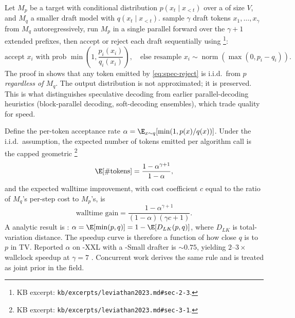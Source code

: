 Let $M_p$ be a target  with conditional distribution $p(x_t \mid
x_{<t})$ over a  of size $V$, and $M_q$ a smaller draft
model with $q(x_t \mid x_{<t})$. \citet{leviathan2023} sample $\gamma$
draft tokens $x_1, \ldots, x_\gamma$ from $M_q$ autoregressively, run
$M_p$ in a single parallel forward over the $\gamma + 1$ extended
prefixes, then accept or reject each draft sequentially using
\citep[\S 2.3]{leviathan2023}\footnote{KB excerpt:
\nolinkurl{kb/excerpts/leviathan2023.md#sec-2-3}.}:
\begin{equation}
\text{accept } x_i \text{ with prob } \min\!\left(1, \frac{p_i(x_i)}{q_i(x_i)}\right),
\quad \text{else resample } x_i \sim \operatorname{norm}(\max(0, p_i - q_i)).
\label{eq:spec-reject}
\end{equation}
The proof in \citet[App.~A.1]{leviathan2023} shows that any token
emitted by \cref{eq:spec-reject} is i.i.d.\ from $p$ \emph{regardless
of $M_q$}. The output distribution is not approximated; it is
preserved. This is what distinguishes speculative decoding from earlier
parallel-decoding heuristics (block-parallel decoding, soft-decoding
ensembles), which trade quality for speed.

Define the per-token acceptance rate
$\alpha = \E_{x \sim q}[\min(1, p(x)/q(x))]$. Under the i.i.d.\
assumption, the expected number of tokens emitted per algorithm call
is the capped geometric \citep[\S 3.1, Eq.~1]{leviathan2023}\footnote{KB
excerpt: \nolinkurl{kb/excerpts/leviathan2023.md#sec-3-1}.}
\begin{equation}
\E[\#\text{tokens}] = \frac{1 - \alpha^{\gamma+1}}{1 - \alpha},
\label{eq:spec-tokens}
\end{equation}
and the expected walltime improvement, with cost coefficient $c$ equal
to the ratio of $M_q$'s per-step cost to $M_p$'s, is
\citep[\S 3.3, Thm.~3.8]{leviathan2023}
\begin{equation}
\text{walltime gain} = \frac{1 - \alpha^{\gamma+1}}{(1-\alpha)(\gamma c + 1)}.
\label{eq:spec-walltime}
\end{equation}
A  analytic result is \citet[Thm.~3.5, Cor.~3.6]{leviathan2023}:
$\alpha = \E[\min(p, q)] = 1 - \E[D_{LK}(p, q)]$, where $D_{LK}$ is
total-variation distance. The speedup curve is therefore a function of
how close $q$ is to $p$ in TV. Reported $\alpha$ on -XXL with a
\glsterm{t5}{T5}-Small drafter is $\sim 0.75$, yielding $2$--$3\times$ wallclock
speedup at $\gamma = 7$ \citep[\S 3.6, Tab.~3]{leviathan2023}.
Concurrent work \citep{chen2023-speculative} derives the same rule
and is treated as joint prior in the field.

